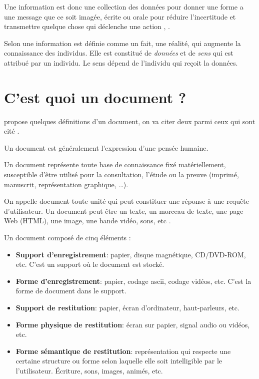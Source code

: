 Une information est donc une collection des données pour donner une forme a une message que ce soit imagée, écrite ou orale pour réduire l’incertitude et transmettre quelque chose qui déclenche une action \citep{thesaurus-ir-web}, \citep{construction-memoire-organisationnel-benayache}.

Selon \citeauthor{j-velo:sys-user} \citep{j-velo:sys-user} une information est définie comme un fait, une réalité, qui augmente la connaissance des individus. Elle est constitué de \textit{données} et de \textit{sens} qui est attribué par un individu. Le sens dépend de l'individu qui reçoit la données.

\section{C'est quoi un document ?}
\citeauthor{thesaurus-ir-web} propose quelques définitions d'un document, on va citer deux parmi ceux qui sont cité \citep{thesaurus-ir-web}.

\begin{definition}
    Un document est généralement l'expression d'une pensée humaine.
\end{definition}

\begin{definition}
    Un document représente toute base de connaissance fixé matériellement, susceptible d'être utilisé pour la consultation, l'étude ou la preuve (imprimé, manuscrit, représentation graphique, \dots).
\end{definition}

\begin{definition}
    On appelle document toute unité qui peut constituer une réponse à une requête d'utilisateur. Un document peut être un texte, un morceau de texte, une page Web (HTML), une image, une bande vidéo, sons, etc \citep{salton1989automatique}.
\end{definition}

Un document composé de cinq éléments \citep{thesaurus-ir-web}:
\begin{itemize}
    \item \textbf{Support d'enregistrement}: papier, disque magnétique, CD/DVD-ROM, etc. C'est un support où le document est stocké.
    \item \textbf{Forme d'enregistrement}: papier, codage ascii, codage vidéos, etc. C'est la forme de document dans le support.
    \item \textbf{Support de restitution}: papier, écran d'ordinateur, haut-parleurs, etc.
    \item \textbf{Forme physique de restitution}: écran sur papier, signal audio ou vidéos, etc.
    \item \textbf{Forme sémantique de restitution}: représentation qui respecte une certaine structure ou forme selon laquelle elle soit intelligible par le l'utilisateur. Écriture, sons, images, animés, etc.
\end{itemize}

